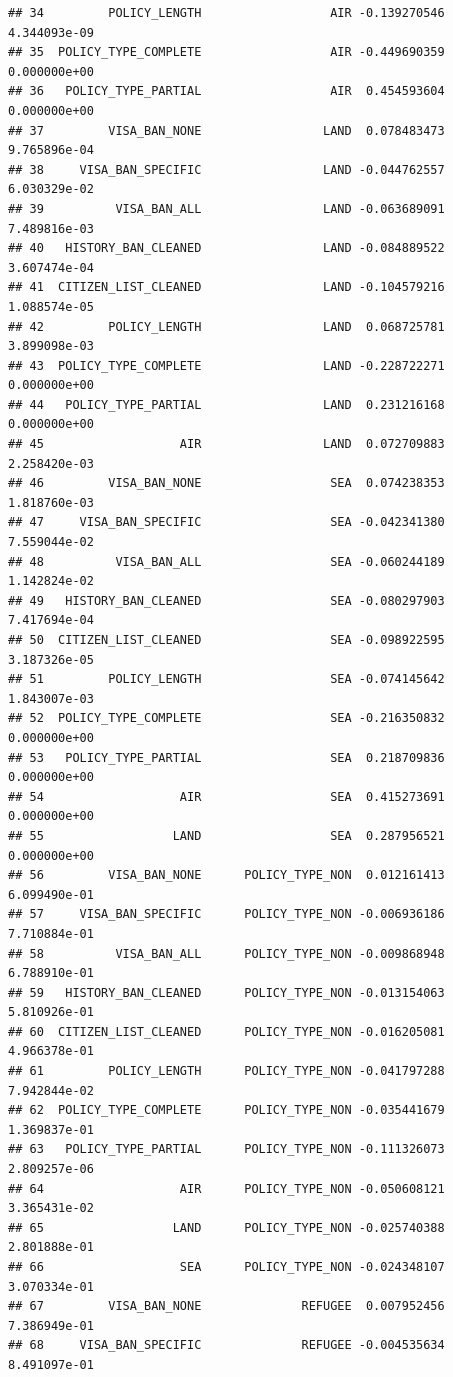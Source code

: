 \documentclass[]{article}
\begin{document}
\begin{verbatim}
## 34         POLICY_LENGTH                  AIR -0.139270546 4.344093e-09
## 35  POLICY_TYPE_COMPLETE                  AIR -0.449690359 0.000000e+00
## 36   POLICY_TYPE_PARTIAL                  AIR  0.454593604 0.000000e+00
## 37         VISA_BAN_NONE                 LAND  0.078483473 9.765896e-04
## 38     VISA_BAN_SPECIFIC                 LAND -0.044762557 6.030329e-02
## 39          VISA_BAN_ALL                 LAND -0.063689091 7.489816e-03
## 40   HISTORY_BAN_CLEANED                 LAND -0.084889522 3.607474e-04
## 41  CITIZEN_LIST_CLEANED                 LAND -0.104579216 1.088574e-05
## 42         POLICY_LENGTH                 LAND  0.068725781 3.899098e-03
## 43  POLICY_TYPE_COMPLETE                 LAND -0.228722271 0.000000e+00
## 44   POLICY_TYPE_PARTIAL                 LAND  0.231216168 0.000000e+00
## 45                   AIR                 LAND  0.072709883 2.258420e-03
## 46         VISA_BAN_NONE                  SEA  0.074238353 1.818760e-03
## 47     VISA_BAN_SPECIFIC                  SEA -0.042341380 7.559044e-02
## 48          VISA_BAN_ALL                  SEA -0.060244189 1.142824e-02
## 49   HISTORY_BAN_CLEANED                  SEA -0.080297903 7.417694e-04
## 50  CITIZEN_LIST_CLEANED                  SEA -0.098922595 3.187326e-05
## 51         POLICY_LENGTH                  SEA -0.074145642 1.843007e-03
## 52  POLICY_TYPE_COMPLETE                  SEA -0.216350832 0.000000e+00
## 53   POLICY_TYPE_PARTIAL                  SEA  0.218709836 0.000000e+00
## 54                   AIR                  SEA  0.415273691 0.000000e+00
## 55                  LAND                  SEA  0.287956521 0.000000e+00
## 56         VISA_BAN_NONE      POLICY_TYPE_NON  0.012161413 6.099490e-01
## 57     VISA_BAN_SPECIFIC      POLICY_TYPE_NON -0.006936186 7.710884e-01
## 58          VISA_BAN_ALL      POLICY_TYPE_NON -0.009868948 6.788910e-01
## 59   HISTORY_BAN_CLEANED      POLICY_TYPE_NON -0.013154063 5.810926e-01
## 60  CITIZEN_LIST_CLEANED      POLICY_TYPE_NON -0.016205081 4.966378e-01
## 61         POLICY_LENGTH      POLICY_TYPE_NON -0.041797288 7.942844e-02
## 62  POLICY_TYPE_COMPLETE      POLICY_TYPE_NON -0.035441679 1.369837e-01
## 63   POLICY_TYPE_PARTIAL      POLICY_TYPE_NON -0.111326073 2.809257e-06
## 64                   AIR      POLICY_TYPE_NON -0.050608121 3.365431e-02
## 65                  LAND      POLICY_TYPE_NON -0.025740388 2.801888e-01
## 66                   SEA      POLICY_TYPE_NON -0.024348107 3.070334e-01
## 67         VISA_BAN_NONE              REFUGEE  0.007952456 7.386949e-01
## 68     VISA_BAN_SPECIFIC              REFUGEE -0.004535634 8.491097e-01

\end{verbatim}
\end{document}
